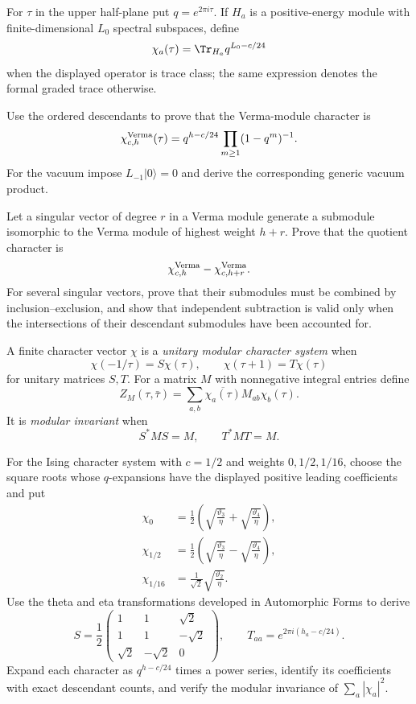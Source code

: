 \begin{exercise}
For $\tau$ in the upper half-plane put $q=e^{2\pi i\tau}$.  If $H_a$ is a
positive-energy module with finite-dimensional $L_0$ spectral subspaces,
define
\[
\chi_a(\tau)=\Tr_{H_a}q^{L_0-c/24}
\]
when the displayed operator is trace class; the same expression denotes
the formal graded trace otherwise.

Use the ordered descendants to prove that the Verma-module character is
\[
\chi_{c,h}^{\rm Verma}(\tau)
=q^{h-c/24}\prod_{m\geq1}(1-q^m)^{-1}.
\]
For the vacuum impose $L_{-1}|0\rangle=0$ and derive the corresponding
generic vacuum product.
\end{exercise}

\begin{exercise}
Let a singular vector of degree $r$ in a Verma module generate a submodule
isomorphic to the Verma module of highest weight $h+r$.  Prove that the
quotient character is
\[
\chi_{c,h}^{\rm Verma}-\chi_{c,h+r}^{\rm Verma}.
\]
For several singular vectors, prove that their submodules must be combined by
inclusion--exclusion, and show that independent subtraction is valid only
when the intersections of their descendant submodules have been accounted
for.
\end{exercise}

\begin{exercise}
A finite character vector $\chi$ is a \emph{unitary modular character
system} when
\[
\chi(-1/\tau)=S\chi(\tau),
\qquad
\chi(\tau+1)=T\chi(\tau)
\]
for unitary matrices $S,T$.  For a matrix $M$ with nonnegative integral
entries define
\[
Z_M(\tau,\bar\tau)
=\sum_{a,b}\overline{\chi_a(\tau)}M_{ab}\chi_b(\tau).
\]
It is \emph{modular invariant} when
\[
S^*MS=M,
\qquad T^*MT=M.
\]

For the Ising character system with $c=1/2$ and weights
$0,1/2,1/16$, choose the square roots whose $q$-expansions have the
displayed positive leading coefficients and put
\[
\begin{aligned}
\chi_0&=\frac12\left(
 \sqrt{\frac{\vartheta_3}{\eta}}+
 \sqrt{\frac{\vartheta_4}{\eta}}\right),\\
\chi_{1/2}&=\frac12\left(
 \sqrt{\frac{\vartheta_3}{\eta}}-
 \sqrt{\frac{\vartheta_4}{\eta}}\right),\\
\chi_{1/16}&=\frac1{\sqrt2}\sqrt{\frac{\vartheta_2}{\eta}}.
\end{aligned}
\]
Use the theta and eta transformations developed in Automorphic Forms to
derive
\[
S=\frac12
\begin{pmatrix}
1&1&\sqrt2\\
1&1&-\sqrt2\\
\sqrt2&-\sqrt2&0
\end{pmatrix},
\qquad
T_{aa}=e^{2\pi i(h_a-c/24)}.
\]
Expand each character as $q^{h-c/24}$ times a power series, identify its
coefficients with exact descendant counts, and verify the modular
invariance of $\sum_a|\chi_a|^2$.
\end{exercise}

